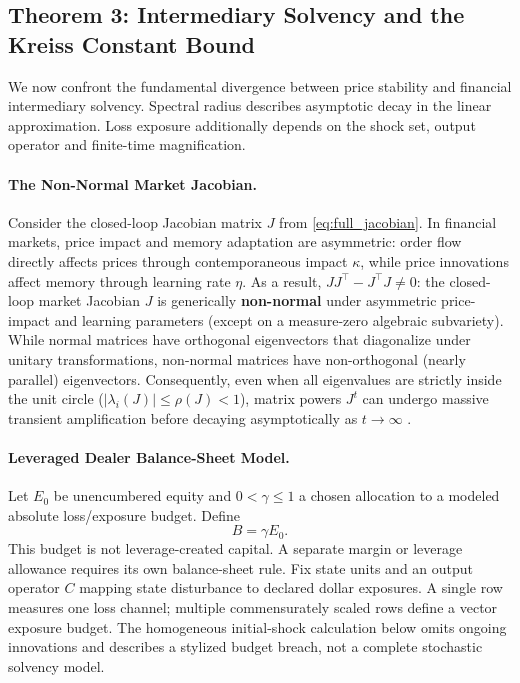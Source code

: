 \documentclass[12pt]{article}
\theoremstyle{definition}
\theoremstyle{remark}
\begin{document}
\subsection{Theorem 3: Intermediary Solvency and the Kreiss Constant Bound}
We now confront the fundamental divergence between price stability and financial intermediary solvency. Spectral radius describes asymptotic decay in the linear approximation. Loss exposure additionally depends on the shock set, output operator and finite-time magnification.

\paragraph{The Non-Normal Market Jacobian.}
Consider the closed-loop Jacobian matrix $J$ from \eqref{eq:full_jacobian}. In financial markets, price impact and memory adaptation are asymmetric: order flow directly affects prices through contemporaneous impact $\kappa$, while price innovations affect memory through learning rate $\eta$. As a result, $J J^\top - J^\top J \neq 0$: the closed-loop market Jacobian $J$ is generically \textbf{non-normal} under asymmetric price-impact and learning parameters (except on a measure-zero algebraic subvariety). While normal matrices have orthogonal eigenvectors that diagonalize under unitary transformations, non-normal matrices have non-orthogonal (nearly parallel) eigenvectors. Consequently, even when all eigenvalues are strictly inside the unit circle ($|\lambda_i(J)| \le \rho(J) < 1$), matrix powers $J^t$ can undergo massive transient amplification before decaying asymptotically as $t \to \infty$ \citep{trefethen2005spectra}.

\paragraph{Leveraged Dealer Balance-Sheet Model.}
Let $E_0$ be unencumbered equity and $0<\gamma\le1$ a chosen allocation to a modeled absolute loss/exposure budget. Define
\begin{equation}B=\gamma E_0.\label{eq:dealer_buffer}\end{equation}
This budget is not leverage-created capital. A separate margin or leverage allowance requires its own balance-sheet rule. Fix state units and an output operator $C$ mapping state disturbance to declared dollar exposures. A single row measures one loss channel; multiple commensurately scaled rows define a vector exposure budget. The homogeneous initial-shock calculation below omits ongoing innovations and describes a stylized budget breach, not a complete stochastic solvency model.
\end{document}
